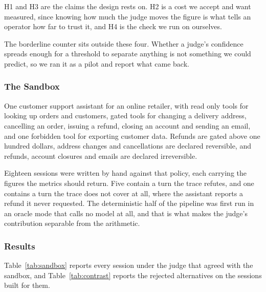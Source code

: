 \documentclass[11pt,a4paper]{article}
\begin{document}
H1 and H3 are the claims the design rests on. H2 is a cost we accept and want
measured, since knowing how much the judge moves the figure is what tells an operator
how far to trust it, and H4 is the check we run on ourselves.

The borderline counter sits outside these four. Whether a judge's confidence spreads
enough for a threshold to separate anything is not something we could predict, so we
ran it as a pilot and report what came back.

\subsubsection{The Sandbox}

One customer support assistant for an online retailer, with read only tools for
looking up orders and customers, gated tools for changing a delivery address,
cancelling an order, issuing a refund, closing an account and sending an email, and
one forbidden tool for exporting customer data. Refunds are gated above one hundred
dollars, address changes and cancellations are declared reversible, and refunds,
account closures and emails are declared irreversible.

Eighteen sessions were written by hand against that policy, each carrying the figures
the metrics should return. Five contain a turn the trace refutes, and one contains a
turn the trace does not cover at all, where the assistant reports a refund it never
requested. The deterministic half of the pipeline was first
run in an oracle mode that calls no model at all, and that is what makes the judge's
contribution separable from the arithmetic.

\subsubsection{Results}

Table~\ref{tab:sandbox} reports every session under the judge that agreed with the
sandbox, and Table~\ref{tab:contrast} reports the rejected alternatives on the
sessions built for them.
\end{document}
